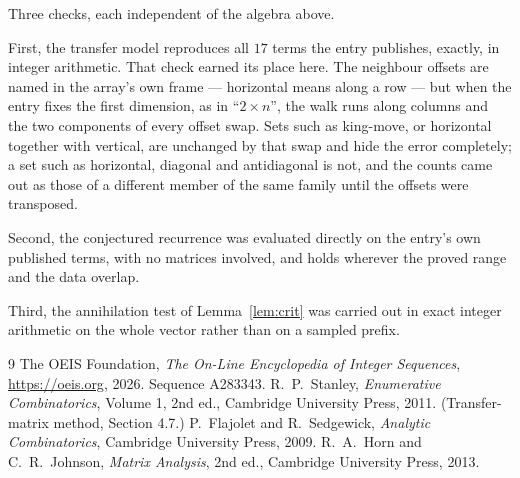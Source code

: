 \documentclass[11pt,a4paper]{article}
\theoremstyle{plain}
\theoremstyle{definition}
\begin{document}
Three checks, each independent of the algebra above.

First, the transfer model reproduces all $17$ terms the entry publishes, exactly, in
integer arithmetic. That check earned its place here. The neighbour offsets are named in the
array's own frame --- horizontal means along a row --- but when the entry fixes the first
dimension, as in ``$2\times n$'', the walk runs along columns and the two components of every
offset swap. Sets such as king-move, or horizontal together with vertical, are unchanged by
that swap and hide the error completely; a set such as horizontal, diagonal and antidiagonal
is not, and the counts came out as those of a different member of the same family until the
offsets were transposed.

Second, the conjectured recurrence was evaluated directly on the entry's own published terms,
with no matrices involved, and holds wherever the proved range and the data overlap.

Third, the annihilation test of Lemma~\ref{lem:crit} was carried out in exact integer
arithmetic on the whole vector rather than on a sampled prefix.

\begin{thebibliography}{9}
 The OEIS Foundation, \emph{The On-Line Encyclopedia of Integer
Sequences}, \url{https://oeis.org}, 2026. Sequence A283343.
 R.~P.~Stanley, \emph{Enumerative Combinatorics}, Volume 1, 2nd ed.,
Cambridge University Press, 2011. (Transfer-matrix method, Section 4.7.)
 P.~Flajolet and R.~Sedgewick, \emph{Analytic Combinatorics}, Cambridge
University Press, 2009.
 R.~A.~Horn and C.~R.~Johnson, \emph{Matrix Analysis}, 2nd ed., Cambridge
University Press, 2013.
\end{thebibliography}
\end{document}
